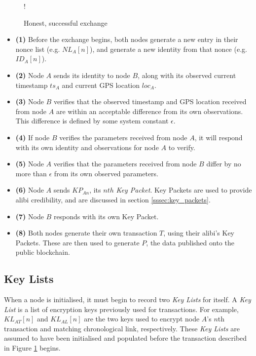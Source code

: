 \begin{figure}[H]
\begin{center}
 {!} {}
\caption{Honest, successful exchange}
\label{fig:transaction}
\end{center}
\end{figure}

\begin{itemize}
	\item[] \textbf{(1)} Before the exchange begins, both nodes generate a new entry in their nonce list (e.g. $NL_A[n]$), and generate a new identity from that nonce (e.g. $ID_A[n]$).
	\item[] \textbf{(2)} Node $A$ sends its identity to node $B$, along with its observed current timestamp $ts_A$ and current GPS location $loc_A$.
	\item[] \textbf{(3)} Node $B$ verifies that the observed timestamp and GPS location received from node $A$ are within an acceptable difference from its own observations. This difference is defined by some system constant $\epsilon$.
	\item[] \textbf{(4)} If node $B$ verifies the parameters received from node $A$, it will respond with its own identity and observations for node $A$ to verify.
	\item[] \textbf{(5)} Node $A$ verifies that the parameters received from node $B$ differ by no more than $\epsilon$ from its own observed parameters.
	\item[] \textbf{(6)} Node $A$ sends $KP_{An}$, its $nth$ \textit{Key Packet}. Key Packets are used to provide alibi credibility, and are discussed in section \ref{sssec:key_packets}.
	\item[] \textbf{(7)} Node $B$ responds with its own Key Packet.
	\item[] \textbf{(8)} Both nodes generate their own transaction $T$, using their alibi's Key Packets. These are then used to generate $P$, the data published onto the public blockchain.
\end{itemize}

\subsection{Key Lists} \label{ssec:key_lists}
When a node is initialised, it must begin to record two \textit{Key Lists} for itself. A \textit{Key List} is a list of encryption keys previously used for transactions. For example, $KL_{AT}[n]$ and $KL_{AL}[n]$ are the two keys used to encrypt node $A$'s $n$th transaction and matching chronological link, respectively. These \textit{Key Lists} are assumed to have been initialised and populated before the transaction described in Figure \ref{fig:transaction} begins.


